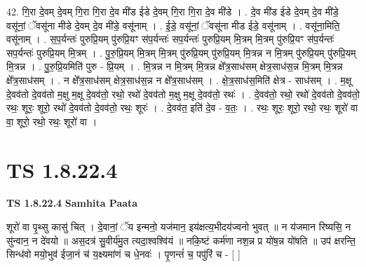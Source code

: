 \documentclass[17pt]{extarticle}
\begin{document}
42. गि॒रा दे॒वम् दे॒वम् गि॒रा गि॒रा दे॒व मी॑ड ईडे दे॒वम् गि॒रा गि॒रा दे॒व मी॑डे । . दे॒व मी॑ड ईडे दे॒वम् दे॒व मी॑डे॒ वसू॑नां॒ ॅवसू॑ना मीडे दे॒वम् दे॒व मी॑डे॒ वसू॑नाम् । . ई॒डे॒ वसू॑नां॒ ॅवसू॑ना मीड ईडे॒ वसू॑नाम् । . वसू॑ना॒मिति॒ वसू॑नाम् । . स॒प॒र्यन्तः॑ पुरुप्रि॒यम् पु॑रुप्रि॒यꣳ स॑प॒र्यन्तः॑ सप॒र्यन्तः॑ पुरुप्रि॒यम् मि॒त्रम् मि॒त्रम् पु॑रुप्रि॒यꣳ स॑प॒र्यन्तः॑ सप॒र्यन्तः॑ पुरुप्रि॒यम् मि॒त्रम् । . पु॒रु॒प्रि॒यम् मि॒त्रम् मि॒त्रम् पु॑रुप्रि॒यम् पु॑रुप्रि॒यम् मि॒त्रन्न न मि॒त्रम् पु॑रुप्रि॒यम् पु॑रुप्रि॒यम् मि॒त्रन्न । . पु॒रु॒प्रि॒यमिति॑ पुरु - प्रि॒यम् । . मि॒त्रन्न न मि॒त्रम् मि॒त्रन्न क्षे᳚त्र॒साध॑सम् क्षेत्र॒साध॑स॒न्न मि॒त्रम् मि॒त्रन्न क्षे᳚त्र॒साध॑सम् । . न क्षे᳚त्र॒साध॑सम् क्षेत्र॒साध॑स॒न्न न क्षे᳚त्र॒साध॑सम् । . क्षे॒त्र॒साध॑स॒मिति॑ क्षेत्र - साध॑सम् । . म॒क्षू दे॒वव॑तो दे॒वव॑तो म॒क्षु म॒क्षू दे॒वव॑तो॒ रथो॒ रथो॑ दे॒वव॑तो म॒क्षु म॒क्षू दे॒वव॑तो॒ रथः॑ । . दे॒वव॑तो॒ रथो॒ रथो॑ दे॒वव॑तो दे॒वव॑तो॒ रथः॒ शूरः॒ शूरो॒ रथो॑ दे॒वव॑तो दे॒वव॑तो॒ रथः॒ शूरः॑ । . दे॒वव॑त॒ इति॑ दे॒व - व॒तः॒ । . रथः॒ शूरः॒ शूरो॒ रथो॒ रथः॒ शूरो॑ वा वा॒ शूरो॒ रथो॒ रथः॒ शूरो॑ वा । \newline
\pagebreak
{}
\section*{ TS 1.8.22.4 }

\textbf{TS 1.8.22.4 } \newline
\textbf{Samhita Paata} \newline

शूरो॑ वा पृ॒थ्सु कासु॑ चित् । दे॒वानां॒ ॅय इन्मनो॒ यज॑मान॒ इय॑क्षत्य॒भीदय॑ज्वनो भुवत् ॥ न य॑जमान रिष्यसि॒ न सु॑न्वान॒ न दे॑वयो ॥ अस॒दत्र॑ सु॒वीर्य॑मु॒त त्यदा॒श्वश्वि॑यं ॥ नकि॒ष्टं कर्म॑णा नश॒न्न प्र यो॑ष॒न्न यो॑षति ॥ उप॑ क्षरन्ति॒ सिन्ध॑वो मयो॒भुव॑ ईजा॒नं च॑ य॒क्ष्यमा॑णं च धे॒नवः॑ । पृ॒णन्तं॑ च॒ पपु॑रिं च - [ ] \newline
\end{document}
